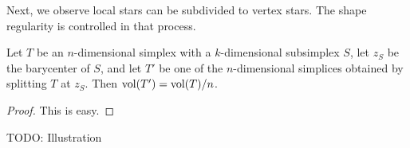 \documentclass[10pt,letterpaper]{article}
\newcommand{\mwl}[1]{{\color{red}#1}}
\begin{document}



Next, we observe local stars can be subdivided to vertex stars.
The shape regularity is controlled in that process. 

\begin{lemma}\label{lemma:stardivision}
    Let $T$ be an $n$-dimensional simplex with a $k$-dimensional subsimplex $S$,
    let $z_S$ be the barycenter of $S$, 
    and let $T'$ be one of the $n$-dimensional simplices obtained by splitting $T$ at $z_{S}$.
    Then $\operatorname{vol}(T') = \operatorname{vol}(T) / n$. 
\end{lemma}
\begin{proof}
    This is easy.
\end{proof}

\mwl{TODO: Illustration}
\end{document}
